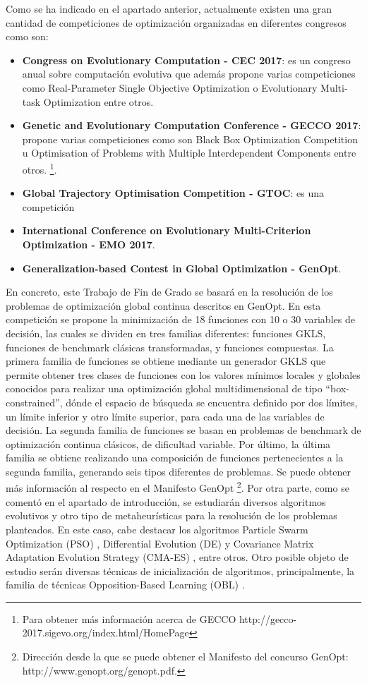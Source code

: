 Como se ha indicado en el apartado anterior, actualmente existen una gran cantidad de competiciones de optimización organizadas en diferentes congresos como son:
\begin{itemize}
  \item \textbf{Congress on Evolutionary Computation - CEC 2017}: es un congreso anual sobre computación evolutiva que además propone varias competiciones como Real-Parameter Single Objective Optimization o Evolutionary Multi-task Optimization entre otros.
  \item \textbf{Genetic and Evolutionary Computation Conference - GECCO 2017}: propone varias competiciones como son Black Box Optimization Competition u Optimisation of Problems with Multiple Interdependent Components entre otros. \footnote{Para obtener más información acerca de GECCO http://gecco-2017.sigevo.org/index.html/HomePage}.
  \item \textbf{Global Trajectory Optimisation Competition - GTOC}: es una competición 
  \item \textbf{International Conference on Evolutionary Multi-Criterion Optimization - EMO 2017}.
  \item \textbf{Generalization-based Contest in Global Optimization - GenOpt}.
\end{itemize}

En concreto, este Trabajo de Fin de Grado se basará en la resolución de los problemas de optimización global continua descritos en GenOpt. En esta competición se propone la minimización de 18 funciones con 10 o 30 variables de decisión, las cuales se dividen en tres familias diferentes: funciones GKLS, funciones de benchmark clásicas transformadas, y funciones compuestas.
La primera familia de funciones se obtiene mediante un generador GKLS \cite{GKLS} que permite obtener tres clases de funciones con los valores mínimos locales y globales conocidos para realizar una optimización global multidimensional de tipo “box-constrained”, dónde el espacio de búsqueda se encuentra definido por dos límites, un límite inferior y otro límite superior, para cada una de las variables de decisión.
La segunda familia de funciones se basan en problemas de benchmark de optimización continua clásicos, de dificultad variable.
\newline
Por último, la última familia se obtiene realizando una composición de funciones pertenecientes a la segunda familia, generando seis tipos diferentes de problemas.	
Se puede obtener más información al respecto en el Manifesto GenOpt \footnote{Dirección desde la que se puede obtener el Manifesto del concurso GenOpt: http://www.genopt.org/genopt.pdf.}.
Por otra parte, como se comentó en el apartado de introducción, se estudiarán diversos algoritmos evolutivos y otro tipo de metaheurísticas para la resolución de los problemas planteados. En este caso, cabe destacar los algoritmos Particle Swarm Optimization (PSO) \cite{GPSO}, Differential Evolution (DE) \cite{metabook} y Covariance Matrix Adaptation Evolution Strategy (CMA-ES) \cite{CMA}, entre otros. Otro posible objeto de estudio serán diversas técnicas de inicialización de algoritmos, principalmente, la familia de técnicas Opposition-Based Learning (OBL) \cite{obl2}.



